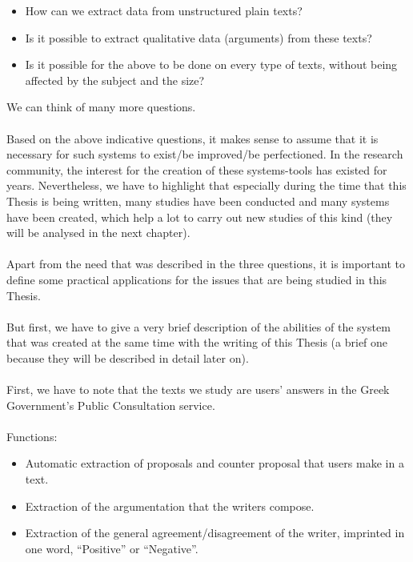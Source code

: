 \begin{itemize}

	\item How can we extract data from unstructured plain texts?
	\item Is it possible to extract qualitative data (arguments) from these texts?
	\item Is it possible for the above to be done on every type of texts, without being affected by the subject and the size?\\

\end{itemize}

We can think of many more questions.\\
\\
Based on the above indicative questions, it makes sense to assume that it is necessary for such systems to exist/be improved/be perfectioned. In the research community, the interest for the creation of these  systems-tools has existed for years. Nevertheless, we have to  highlight that especially during the time that this Thesis is being written, many studies have been conducted and many systems have been created, which help a lot to carry out new studies of this kind (they will be analysed in the next chapter).\\
\\
Apart from the need that was described in the three questions, it is important to define some practical applications for the issues that are being studied in this Thesis.\\
\\
But first, we have to give a very brief description of the abilities of the system that was created at the same time with the writing of this Thesis (a brief one because they will be described in detail later on).\\
\\
First, we have to note that the texts we study are users' answers in the Greek Government's Public Consultation service.\\
\\
Functions:\\

\begin{itemize}

	\item Automatic extraction of proposals and counter proposal that users make in a text.
	\item Extraction of the argumentation that the writers compose.
	\item Extraction of the general agreement/disagreement of the writer, imprinted in one word, ``Positive'' or ``Negative''.\\

\end{itemize}

